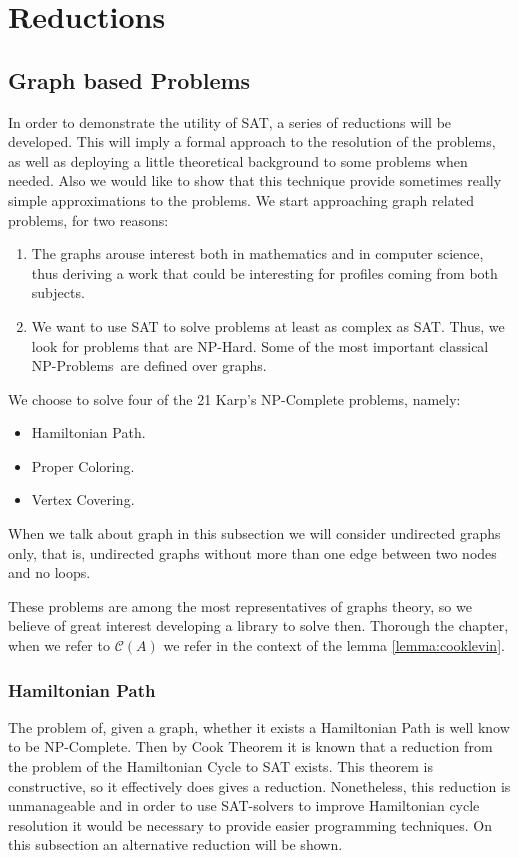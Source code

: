 \section{Reductions}
\subsection{Graph based Problems}
In order to demonstrate the utility of SAT, a series of reductions will be developed. This will imply a formal approach to the resolution of the problems, as well as deploying a little theoretical background to some problems when needed. Also we would like to show that this technique provide sometimes really simple approximations to the problems. We start approaching graph related problems, for two reasons:

\begin{enumerate}
\item The graphs arouse interest both in mathematics and in computer science, thus deriving a work that could be interesting for profiles coming from both subjects.
\item We want to use SAT to solve problems at least as complex as SAT. Thus, we look for problems that are NP-Hard. Some of the most important classical NP-Problems\ are defined over graphs. 
\end{enumerate}
 
We choose to solve four of the 21 Karp's NP-Complete problems\cite{karp1972reducibility}, namely:
\begin{itemize}
\item Hamiltonian Path.
\item Proper Coloring.
\item Vertex Covering.
\end{itemize}

When we talk about graph in this subsection we will consider undirected graphs only, that is, undirected graphs without more than one edge between two nodes and no loops.

These problems are among the most representatives of graphs theory, so we believe of great interest developing a library to solve then. Thorough the chapter, when we refer to $\mathcal{C}(A)$ we refer in the context of the lemma \ref{lemma:cooklevin}.


\subsubsection{Hamiltonian Path}

The problem of, given a graph, whether it exists a Hamiltonian Path is well know to be NP-Complete. Then by Cook Theorem it is known that a reduction from the problem of the Hamiltonian Cycle to SAT exists. This theorem is constructive, so it effectively does gives a reduction. Nonetheless, this reduction is unmanageable and in order to use SAT-solvers to improve Hamiltonian cycle resolution it would be necessary to provide easier programming techniques. On this subsection an alternative reduction will be shown.

